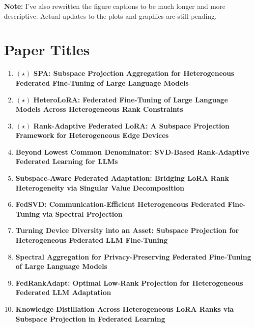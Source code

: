 \documentclass[11pt]{article}
\begin{document}
\textbf{Note:} I've also rewritten the figure captions to be much longer and more descriptive. Actual updates to the plots and graphics are still pending.

\section*{ Paper Titles}


\begin{enumerate}[leftmargin=*, label=\textbf{\arabic*.}]

    \item $(\star)$ \textbf{SPA: Subspace Projection Aggregation for Heterogeneous Federated Fine-Tuning of Large Language Models} \\
    
    \item $(\star)$ \textbf{HeteroLoRA: Federated Fine-Tuning of Large Language Models Across Heterogeneous Rank Constraints} \\
    
    \item $(\star)$ \textbf{Rank-Adaptive Federated LoRA: A Subspace Projection Framework for Heterogeneous Edge Devices} \\
   
    \item \textbf{Beyond Lowest Common Denominator: SVD-Based Rank-Adaptive Federated Learning for LLMs} \\
    
    \item \textbf{Subspace-Aware Federated Adaptation: Bridging LoRA Rank Heterogeneity via Singular Value Decomposition} \\
   
    \item \textbf{FedSVD: Communication-Efficient Heterogeneous Federated Fine-Tuning via Spectral Projection} \\
   
    \item \textbf{Turning Device Diversity into an Asset: Subspace Projection for Heterogeneous Federated LLM Fine-Tuning} \\
    
    \item \textbf{Spectral Aggregation for Privacy-Preserving Federated Fine-Tuning of Large Language Models} \\
    
    \item \textbf{FedRankAdapt: Optimal Low-Rank Projection for Heterogeneous Federated LLM Adaptation} \\
   
    \item \textbf{Knowledge Distillation Across Heterogeneous LoRA Ranks via Subspace Projection in Federated Learning} \\
   
\end{enumerate}
\end{document}
